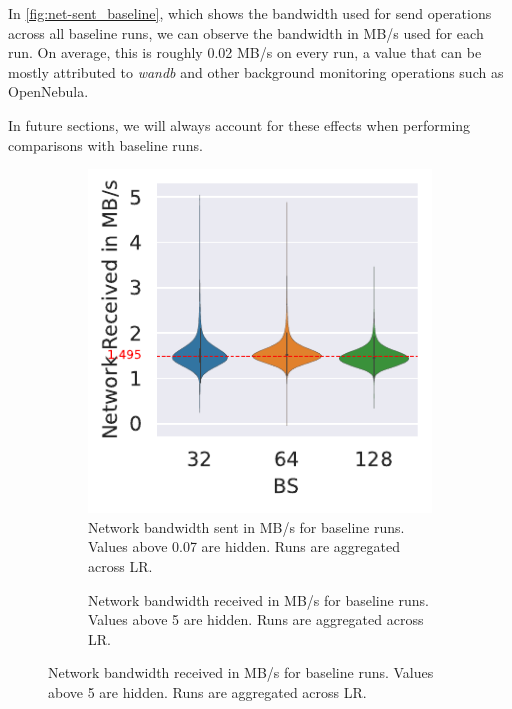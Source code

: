 In \autoref{fig:net-sent_baseline}, which shows the bandwidth used for send operations across all baseline runs, we can observe the bandwidth in MB/s used for each run.
On average, this is roughly 0.02 MB/s on every run, a value that can be mostly attributed to \textit{wandb} and other background monitoring operations such as OpenNebula.

In future sections, we will always account for these effects when performing comparisons with baseline runs.

\begin{figure}[h]
    \centering
    \begin{subfigure}[b]{0.475 \textwidth}
        \centering
        \caption{Network bandwidth sent in MB/s for baseline runs. Values above 0.07 are hidden. Runs are aggregated across LR.}
        \label{fig:net-sent_baseline}
        \includegraphics[width=\textwidth]{./figures/06_net-recv_baseline-16vCPUs-GAS-1.pdf}
    \end{subfigure}%
    \hfill
    \centering
    \begin{subfigure}[b]{0.475 \textwidth}
        \centering
        \caption{Network bandwidth received in MB/s for baseline runs. Values above 5 are hidden. Runs are aggregated across LR.}
        \label{fig:net-recv_baseline}

\end{subfigure}
\end{figure}
